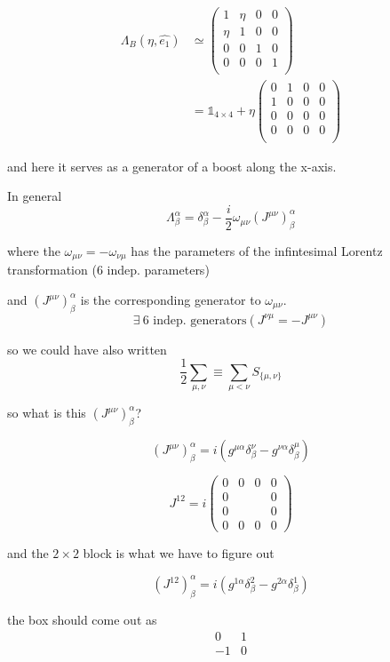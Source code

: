 \documentclass[11pt]{article}
\begin{document}
\begin{align*}
	\Lambda_B (\eta, \hat{e_1}) & \simeq \begin{pmatrix}
		1 & \eta & 0 & 0\\
		\eta & 1 & 0 & 0\\
		0 & 0 & 1 & 0\\
		0 & 0&  0 & 1\\
	\end{pmatrix}\\
		& = \mathbb{1}_{4\times 4} + \eta \begin{pmatrix}
		0 & 1 & 0 & 0\\
		1 & 0 & 0 & 0\\
		0 & 0 & 0 & 0\\
		0 & 0 & 0 & 0\\
	\end{pmatrix}
\end{align*}


and here it serves as a generator  of a boost along the x-axis.

In general \[ \Lambda^\alpha_\beta = \delta^\alpha_\beta - \frac{i}{2} \omega_{\mu\nu} (J^{\mu\nu})^\alpha_\beta\]

where the $\omega_{\mu\nu} = - \omega_{\nu\mu}$ has the parameters of the infintesimal Lorentz transformation (6 indep. parameters)

and $(J^{\mu\nu})^\alpha_\beta$ is the corresponding generator to $\omega_{\mu\nu}$. \[ \exists\ \text{6  indep. generators} (J^{\nu\mu} = - J^{\mu\nu})\]


so we could have also written \[ \frac{1}{2} \sum_{\mu,\nu} \equiv \sum_{\mu < \nu} S_{\{\mu, \nu\}}\]	


so what is this $(J^{\mu\nu})^\alpha_\beta$?

\[ (J^{\mu\nu})^\alpha_\beta = i(g^{\mu\alpha} \delta ^\nu_\beta - g^{\nu\alpha} \delta^\mu_\beta) \]

\[ J^{12} = i \begin{pmatrix}
	0 & 0 & 0 & 0\\
	0 & & &0\\
	0 & & & 0\\
	0 & 0 & 0 & 0
\end{pmatrix}\]

and the $2\times2$ block is what we have to figure out

\[ (J^{12})^\alpha_\beta =
 i(g^{1\alpha} \delta^{2}_{\beta} - g^{2\alpha} \delta^1_\beta )\]
 
 
 the box should come out as \[\begin{matrix}
 	0 & 1 \\
 	-1 & 0\\
 \end{matrix}\]
 
\end{document}

